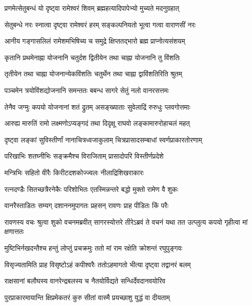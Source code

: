 \twolineshloka
{प्रणमेत्सेतुबन्धं यो दृष्ट्वा रामेश्वरं शिवम्}
{ब्रह्महत्यादिपापेभ्यो मुच्यते मदनुग्रहात्} %

\twolineshloka
{सेतुबन्धे नरः स्नात्वा दृष्ट्वा रामेश्वरं हरम्}
{सङ्कल्पनियतो भूत्वा गत्वा वाराणसीं नरः} %

\twolineshloka
{आनीय गङ्गासलिलं रामेशमभिषिच्य च}
{समुद्रे क्षिप्ततद्भारो ब्रह्म प्राप्नोत्यसंशयम्} %

\twolineshloka
{कृतानि प्रथमेनाह्ना योजनानि चतुर्दश}
{द्वितीयेन तथा चाह्ना योजनानि तु विंशतिः} %

\twolineshloka
{तृतीयेन तथा चाह्ना योजनान्येकविंशतिः}
{चतुर्थेन तथा चाह्ना द्वाविंशतिरिति श्रुतम्} %

\twolineshloka
{पञ्चमेन त्रयोविंशद्योजनानि समन्ततः}
{बबन्ध सागरे सेतुं नलो वानरसत्तमः} %

\twolineshloka
{तेनैव जग्मुः कपयो योजनानां शतं द्रुतम्}
{असङ्ख्याताः सुवेलाद्रिं रुरुधुः प्लवगोत्तमाः} %

\twolineshloka
{आरुह्य मारुतिं रामो लक्ष्मणोऽप्यङ्गदं तथा}
{दिदृक्षू राघवो लङ्कामारुरोहाचलं महत्} %

\twolineshloka
{दृष्ट्वा लङ्कां सुविस्तीर्णां नानाचित्रध्वजाकुलाम्}
{चित्रप्रासादसम्बाधां स्वर्णप्राकारतोरणाम्} %

\twolineshloka
{परिखाभिः शतघ्नीभिः सङ्क्रमैश्च विराजिताम्}
{प्रासादोपरि विस्तीर्णप्रदेशे} %

\twolineshloka
{मन्त्रिभिः सहितो वीरैः किरीटदशकोज्ज्वलः}
{नीलाद्रिशिखराकारः} %

\twolineshloka
{रत्नदण्डैः सितच्छत्रैरनेकैः परिशोभितः}
{एतस्मिन्नन्तरे बद्धो मुक्तो रामेण वै शुकः} %

\twolineshloka
{वानरैस्ताडितः सम्यग् दशाननमुपागतः}
{प्रहसन् रावणः प्राह पीडितः किं परैः} %

\threelineshloka
{रावणस्य वचः श्रुत्वा शुको वचनमब्रवीत्}
{सागरस्योत्तरे तीरेऽब्रवं ते वचनं यथा}
{तत उत्प्लुत्य कपयो गृहीत्वा मां क्षणात्ततः} %

\twolineshloka
{मुष्टिभिर्नखदन्तैश्च हन्तुं लोप्तुं प्रचक्रमुः}
{ततो मां राम रक्षेति क्रोशन्तं रघुपुङ्गवः} %

\twolineshloka
{विसृज्यतामिति प्राह विसृष्टोऽहं कपीश्वरैः}
{ततोऽहमागतो भीत्या दृष्ट्वा तद्वानरं बलम्} %

\twolineshloka
{राक्षसानां बलौघस्य वानरेन्द्रबलस्य च}
{नैतयोर्विद्यते सन्धिर्देवदानवयोरिव} %

\twolineshloka
{पुरप्राकारमायान्ति क्षिप्रमेकतरं कुरु}
{सीतां वास्मै प्रयच्छाशु युद्धं वा दीयताम्} %

